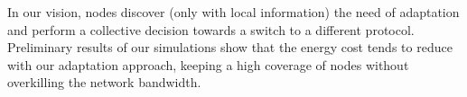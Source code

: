 \documentclass[11pt,twoside]{article}
\begin{document}
%

In our vision, nodes discover (only with local information) the need of adaptation and perform a collective decision towards a switch to a different protocol.
%
Preliminary results of our simulations show that the energy cost tends to reduce with our adaptation approach, keeping a high coverage of nodes without overkilling the network bandwidth.

\newpage

\hypertarget{lastpage}{}
\end{document}

